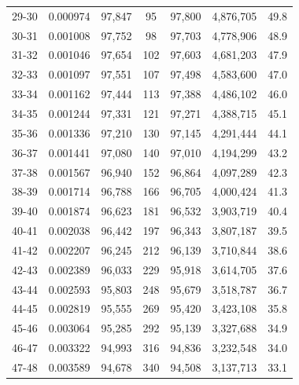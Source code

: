 \documentclass[10pt,a4paper]{article}
\begin{document}
\begin{longtable}{|c|c|c|c|c|c|c|}
29-30  & 0.000974      & 97,847       & 95            & 97,800        & 4,876,705    & 49.8         \\
30-31  & 0.001008      & 97,752       & 98            & 97,703        & 4,778,906    & 48.9         \\
31-32  & 0.001046      & 97,654       & 102           & 97,603        & 4,681,203    & 47.9         \\
32-33  & 0.001097      & 97,551       & 107           & 97,498        & 4,583,600    & 47.0         \\
33-34  & 0.001162      & 97,444       & 113           & 97,388        & 4,486,102    & 46.0         \\
34-35  & 0.001244      & 97,331       & 121           & 97,271        & 4,388,715    & 45.1         \\
35-36  & 0.001336      & 97,210       & 130           & 97,145        & 4,291,444    & 44.1         \\
36-37  & 0.001441      & 97,080       & 140           & 97,010        & 4,194,299    & 43.2         \\
37-38  & 0.001567      & 96,940       & 152           & 96,864        & 4,097,289    & 42.3         \\
38-39  & 0.001714      & 96,788       & 166           & 96,705        & 4,000,424    & 41.3         \\
39-40  & 0.001874      & 96,623       & 181           & 96,532        & 3,903,719    & 40.4         \\
40-41  & 0.002038      & 96,442       & 197           & 96,343        & 3,807,187    & 39.5         \\
41-42  & 0.002207      & 96,245       & 212           & 96,139        & 3,710,844    & 38.6         \\
42-43  & 0.002389      & 96,033       & 229           & 95,918        & 3,614,705    & 37.6         \\
43-44  & 0.002593      & 95,803       & 248           & 95,679        & 3,518,787    & 36.7         \\
44-45  & 0.002819      & 95,555       & 269           & 95,420        & 3,423,108    & 35.8         \\
45-46  & 0.003064      & 95,285       & 292           & 95,139        & 3,327,688    & 34.9         \\
46-47  & 0.003322      & 94,993       & 316           & 94,836        & 3,232,548    & 34.0         \\
47-48  & 0.003589      & 94,678       & 340           & 94,508        & 3,137,713    & 33.1         \\

\end{longtable}
\end{document}
